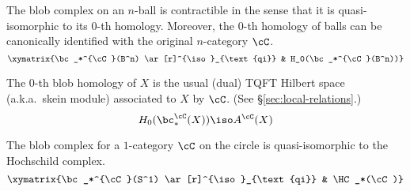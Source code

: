 \begin{property}[Contractibility]
\label{property:contractibility}%
The blob complex on an $n$-ball is contractible in the sense that it is quasi-isomorphic to its $0$-th homology. Moreover, the $0$-th homology of balls can be canonically identified with the original $n$-category $\cC$.
\begin{equation}
\xymatrix{\bc_*^{\cC}(B^n) \ar[r]^{\iso}_{\text{qi}} & H_0(\bc_*^{\cC}(B^n))}
\end{equation}
\end{property}

\begin{property}
\label{property:skein-modules}%
The $0$-th blob homology of $X$ is the usual 
(dual) TQFT Hilbert space (a.k.a.\ skein module) associated to $X$
by $\cC$. (See \S \ref{sec:local-relations}.)
\begin{equation*}
H_0(\bc_*^{\cC}(X)) \iso A^{\cC}(X)
\end{equation*}
\end{property}

\begin{property}[Hochschild homology when $X=S^1$]
\label{property:hochschild}%
The blob complex for a $1$-category $\cC$ on the circle is
quasi-isomorphic to the Hochschild complex.
\begin{equation*}
\xymatrix{\bc_*^{\cC}(S^1) \ar[r]^{\iso}_{\text{qi}} & \HC_*(\cC)}
\end{equation*}
\end{property}

